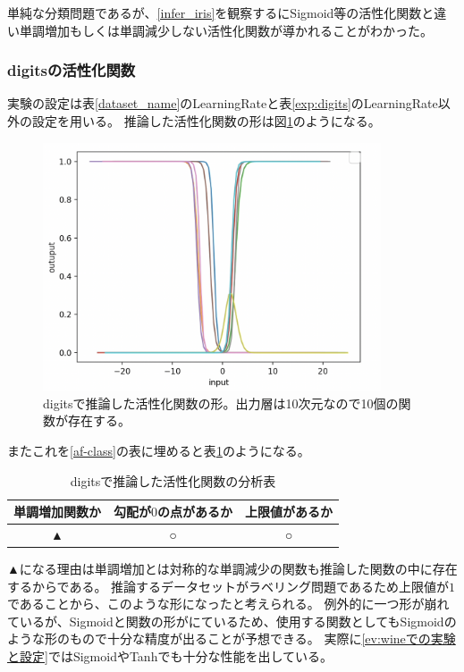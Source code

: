 単純な分類問題であるが、\ref{infer_iris}を観察するにSigmoid等の活性化関数と違い単調増加もしくは単調減少しない活性化関数が導かれることがわかった。




\subsubsection{digitsの活性化関数}
実験の設定は表\ref{dataset_name}のLearningRateと表\ref{exp:digits}のLearningRate以外の設定を用いる。
推論した活性化関数の形は図\ref{infer_digits}のようになる。
\begin{figure}[hbtp]
    \begin{center}
        \includegraphics[width=10cm]{asset/digits-0.1.png}
            \caption{digitsで推論した活性化関数の形。出力層は10次元なので10個の関数が存在する。}
            \label{infer_digits}
    \end{center}
\end{figure}

またこれを\ref{af-class}の表に埋めると表\ref{anal_digits}のようになる。
\begin{table}[htbp]
    \begin{center}
        \caption{digitsで推論した活性化関数の分析表}
        \label{anal_digits}
        \vspace{2mm} 
        \begin{tabular}{ |c|c|c| }
        \hline
        単調増加関数か & 勾配が$ 0 $の点があるか & 上限値があるか   \\
        \hline
        ▲ & ○ & ○   \\
        \hline
        \end{tabular}
    \end{center}
\end{table}

▲になる理由は単調増加とは対称的な単調減少の関数も推論した関数の中に存在するからである。
推論するデータセットがラベリング問題であるため上限値が$ 1 $であることから、このような形になったと考えられる。
例外的に一つ形が崩れているが、Sigmoidと関数の形がにているため、使用する関数としてもSigmoidのような形のもので十分な精度が出ることが予想できる。
実際に\ref{ev:wineでの実験と設定}ではSigmoidやTanhでも十分な性能を出している。


